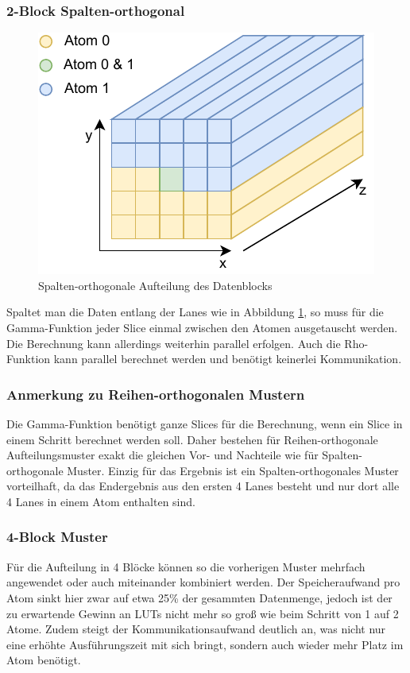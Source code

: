 \subsubsection{2-Block Spalten-orthogonal}
\begin{figure}
    \center
    \includegraphics{images/Spaltenorthogonal.pdf}
    \caption{Spalten-orthogonale Aufteilung des Datenblocks}
    \label{fig:2_block_spaltenorthogonal}
\end{figure}
Spaltet man die Daten entlang der Lanes wie in Abbildung \ref{fig:2_block_spaltenorthogonal}, so muss für die Gamma-Funktion jeder Slice
einmal zwischen den Atomen ausgetauscht werden. Die Berechnung kann allerdings weiterhin parallel erfolgen. Auch die Rho-Funktion kann
parallel berechnet werden und benötigt keinerlei Kommunikation.

\subsubsection{Anmerkung zu Reihen-orthogonalen Mustern}
Die Gamma-Funktion benötigt ganze Slices für die Berechnung, wenn ein Slice in einem Schritt berechnet werden soll. Daher bestehen für Reihen-orthogonale Aufteilungsmuster exakt die gleichen
Vor- und Nachteile wie für Spalten-orthogonale Muster.
Einzig für das Ergebnis ist ein Spalten-orthogonales Muster vorteilhaft, da das Endergebnis aus den ersten 4 Lanes besteht und nur dort alle 4 Lanes in einem Atom enthalten sind.

\subsubsection{4-Block Muster}
Für die Aufteilung in 4 Blöcke können so die vorherigen Muster mehrfach angewendet oder auch miteinander kombiniert werden.
Der Speicheraufwand pro Atom sinkt hier zwar auf etwa 25\% der gesammten Datenmenge, jedoch ist der zu erwartende Gewinn an LUTs nicht mehr so groß wie beim Schritt von 1 auf 2 Atome.
Zudem steigt der Kommunikationsaufwand deutlich an, was nicht nur eine erhöhte Ausführungszeit mit sich bringt, sondern auch wieder mehr Platz im Atom benötigt.